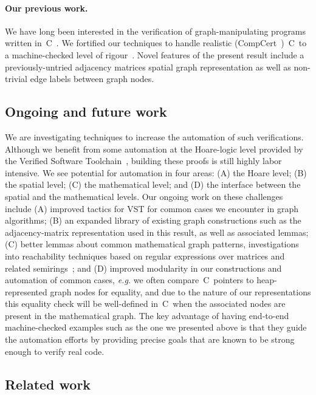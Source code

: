 \paragraph{Our previous work.} We have long been interested in
the verification of graph-manipulating programs written in~C~\cite{hobor:ramification}.
We fortified our techniques to handle realistic (CompCert~\cite{leroy:compcert})~C~to a machine-checked level of rigour~\cite{DBLP:journals/pacmpl/WangCMH19}.  Novel features of the present result include a previously-untried adjacency matrices spatial graph representation as well as non-trivial edge labels between graph nodes. %

\subsection{Ongoing and future work}
We are investigating techniques to increase the automation of such verifications.  Although
we benefit from some automation at the Hoare-logic level provided by the Verified Software
Toolchain~\cite{appel:programlogics}, building these proofs is still highly labor intensive.  We see potential
for automation in four areas: (A) the Hoare level; (B) the spatial level; (C) the mathematical level; and (D) the interface between the spatial and the mathematical levels.  Our ongoing work
on these challenges include (A) improved tactics for VST for common cases we encounter in graph
algorithms; (B) an expanded library of existing graph constructions such as the adjacency-matrix representation used in this result, as well as associated lemmas;
(C) better lemmas about common mathematical graph patterns, investigations into reachability techniques
based on regular expressions over matrices and related semirings~\cite{backhouse,DBLP:journals/jacm/Tarjan81a,dolan2013fun,krishna2017go}; and (D) improved modularity in our constructions and
automation of common cases, \emph{e.g.} we often compare~C~pointers to heap-represented graph
nodes for equality, and due to the nature of our representations this equality check will be
well-defined in~C~when the associated nodes are present in the mathematical graph.  The key
advantage of having end-to-end machine-checked examples such as the one we presented above is
that they guide the automation efforts by providing precise goals that are known to be strong
enough to verify real code.

\subsection{Related work}

